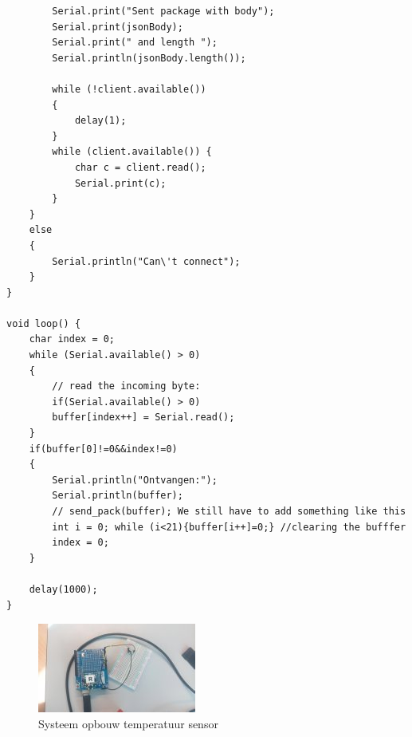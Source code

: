 \documentclass[12pt]{article}
\begin{document}
\begin{lstlisting}
        Serial.print("Sent package with body");
        Serial.print(jsonBody);       
        Serial.print(" and length ");
        Serial.println(jsonBody.length());

        while (!client.available())
        {
            delay(1);
        }
        while (client.available()) {
            char c = client.read();
            Serial.print(c);
        }
    }
    else
    {
        Serial.println("Can\'t connect");
    }
}

void loop() {
    char index = 0;
    while (Serial.available() > 0) 
    {
        // read the incoming byte:
        if(Serial.available() > 0)
        buffer[index++] = Serial.read();
    }
    if(buffer[0]!=0&&index!=0)
    {
        Serial.println("Ontvangen:");
        Serial.println(buffer);
        // send_pack(buffer); We still have to add something like this
        int i = 0; while (i<21){buffer[i++]=0;} //clearing the bufffer
        index = 0;
    }

    delay(1000);
}
\end{lstlisting}
\begin{center}
\begin{figure}[h]
\includegraphics{Setup_4.jpg}
\caption{Systeem opbouw temperatuur sensor}
\label{fig:output9}
\end{figure}   
\end{center}
\end{document}
